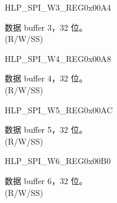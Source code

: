 \begin{register}{H}{LP\_SPI\_W3\_REG}{0x00A4}\label{regdesc:LPSPIW3REG}
%
\regnewline%
\begin{regdesc}\begin{reglist}
\label{fielddesc:LPSPIBUF3}\item [LP\_SPI\_BUF3] 数据 buffer 3，32 位。\\
(R/W/SS)
\end{reglist}\end{regdesc}
\end{register}


\begin{register}{H}{LP\_SPI\_W4\_REG}{0x00A8}\label{regdesc:LPSPIW4REG}
%
\regnewline%
\begin{regdesc}\begin{reglist}
\label{fielddesc:LPSPIBUF4}\item [LP\_SPI\_BUF4] 数据 buffer 4，32 位。\\
(R/W/SS)
\end{reglist}\end{regdesc}
\end{register}


\begin{register}{H}{LP\_SPI\_W5\_REG}{0x00AC}\label{regdesc:LPSPIW5REG}
%
\regnewline%
\begin{regdesc}\begin{reglist}
\label{fielddesc:LPSPIBUF5}\item [LP\_SPI\_BUF5] 数据 buffer 5，32 位。\\
(R/W/SS)
\end{reglist}\end{regdesc}
\end{register}


\begin{register}{H}{LP\_SPI\_W6\_REG}{0x00B0}\label{regdesc:LPSPIW6REG}
%
\regnewline%
\begin{regdesc}\begin{reglist}
\label{fielddesc:LPSPIBUF6}\item [LP\_SPI\_BUF6] 数据 buffer 6，32 位。\\
(R/W/SS)
\end{reglist}\end{regdesc}
\end{register}


